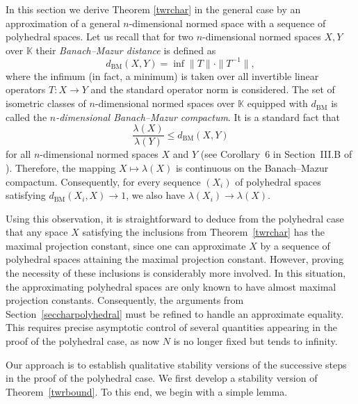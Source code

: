 \documentclass[12pt, reqno]{amsart}
\theoremstyle{definition}
\theoremstyle{remark}
\numberwithin{equation}{section}
\newcommand\dbm{d_{\mathrm{BM}}}
\begin{document}
In this section we derive Theorem \ref{twrchar} in the general case by an approximation of a general $n$-dimensional normed space with a sequence of polyhedral spaces. Let us recall that for two $n$-dimensional normed spaces $X, Y$ over $\mathbb{K}$ their \emph{Banach--Mazur distance} is defined as
$$\dbm(X, Y) = \inf \|T\|\cdot \|T^{-1}\|,$$
where the infimum (in fact, a minimum) is taken over all invertible linear operators $T: X \to Y$ and the standard operator norm is considered. The set of isometric classes of $n$-dimensional normed spaces over $\mathbb{K}$ equipped with $\dbm$ is called the \emph{$n$-dimensional Banach--Mazur compactum}. It is a standard fact that 
$$ \frac{\lambda(X)}{\lambda(Y)}\le \dbm(X,Y)$$
for all $n$-dimensional normed spaces $X$ and $Y$ (see Corollary~6 in Section~III.B of \cite{wojtaszczyk}). Therefore, the mapping $X\mapsto\lambda(X)$ is continuous on the Banach--Mazur compactum. Consequently, for every sequence $(X_i)$ of polyhedral spaces satisfying $\dbm(X_i,X)\to 1$, we also have $\lambda(X_i)\to\lambda(X)$.

Using this observation, it is straightforward to deduce from the polyhedral case that any space $X$ satisfying the inclusions from Theorem~\ref{twrchar} has the maximal projection constant, since one can approximate $X$ by a sequence of polyhedral spaces attaining the maximal projection constant. However, proving the necessity of these inclusions is considerably more involved. In this situation, the approximating polyhedral spaces are only known to have almost maximal projection constants. Consequently, the arguments from Section~\ref{seccharpolyhedral} must be refined to handle an approximate equality. This requires precise asymptotic control of several quantities appearing in the proof of the polyhedral case, as now $N$ is no longer fixed but tends to infinity.

Our approach is to establish qualitative stability versions of the successive steps in the proof of the polyhedral case. We first develop a stability version of Theorem~\ref{twrbound}. To this end, we begin with a simple lemma.
\end{document}
